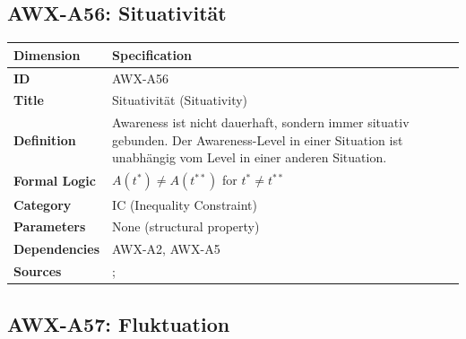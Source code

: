 
\subsection{AWX-A56: Situativität}

\begin{table}[htbp]
\small
\begin{tabular}{p{3cm}p{11cm}}
\toprule
\textbf{Dimension} & \textbf{Specification} \\
\midrule
\textbf{ID} & AWX-A56 \\
\textbf{Title} & Situativität (Situativity) \\
\textbf{Definition} & Awareness ist nicht dauerhaft, sondern immer situativ gebunden. Der Awareness-Level in einer Situation ist unabhängig vom Level in einer anderen Situation. \\
\textbf{Formal Logic} & $A(t^*) \neq A(t^{**})$ for $t^* \neq t^{**}$ \\
\textbf{Category} & IC (Inequality Constraint) \\
\textbf{Parameters} & None (structural property) \\
\textbf{Dependencies} & AWX-A2, AWX-A5 \\
\textbf{Sources} & \citet{PAP-kahneman2003maps}; \citet{PAP-tversky1981framing} \\
\bottomrule
\end{tabular}
\end{table}


\subsection{AWX-A57: Fluktuation}

